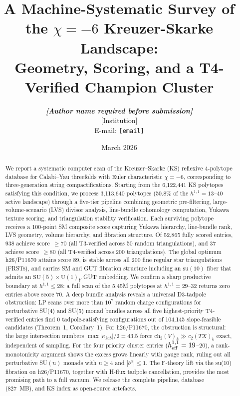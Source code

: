 \documentclass[11pt,a4paper]{article}
\title{%
  \textbf{A Machine-Systematic Survey of the $\chi = -6$
  Kreuzer-Skarke Landscape:}\\[4pt]
  \large Geometry, Scoring, and a T4-Verified Champion Cluster
}
\author{%
  \textit{\normalsize \textbf{[Author name required before submission]}}
  \\[6pt]
  \small [Institution]
  \\[4pt]
  \small E-mail: \texttt{[email]}
}
\date{March 2026}
\newcommand{\hone}{h^{1,1}}
\newcommand{\ch}{\mathrm{ch}}
\begin{document}
\maketitle
\tableofcontents

\begin{abstract}
We report a systematic computer scan of the Kreuzer--Skarke (KS)
reflexive 4-polytope database for Calabi--Yau threefolds with
Euler characteristic $\chi = -6$, corresponding to
three-generation string compactifications.
Starting from the 6,122,441 KS polytopes satisfying this
condition, we process 3,113,640 polytopes (50.8\% of the
$h^{1,1} = 13$--40 active landscape) through a five-tier
pipeline combining geometric pre-filtering, large-volume-scenario
(LVS) divisor analysis, line-bundle cohomology computation,
Yukawa texture scoring, and triangulation stability verification.
Each surviving polytope receives a 100-point SM composite score
capturing Yukawa hierarchy, line-bundle rank, LVS geometry,
volume hierarchy, and fibration structure.
Of 52,865 fully scored entries, 938 achieve score~$\geq 70$
(all T3-verified across 50 random triangulations),
and 37 achieve score~$\geq 80$ (all T4-verified across 200
triangulations).
The global optimum h26/P11670 attains score 89, is stable across
all 200 fine regular star triangulations (FRSTs), and carries
SM and GUT fibration structure including an $\mathrm{su}(10)$
fiber that admits an $\mathrm{SU}(5)\times\mathrm{U}(1)_Y$
GUT embedding.
We confirm a sharp productive boundary at $h^{1,1} \leq 28$:
a full scan of the 5.45M polytopes at $h^{1,1} = 29$--32
returns zero entries above score 70.
A deep bundle analysis reveals a universal D3-tadpole obstruction:
LP scans over more than $10^7$ random charge configurations for
perturbative SU(4) and SU(5) monad bundles across all five
highest-priority T4-verified entries find 0 tadpole-satisfying
configurations out of 104{,}145 slope-feasible candidates
(Theorem~1, Corollary~1).
For h26/P11670, the obstruction is structural: the large intersection
numbers $\max|\kappa_{kab}|/2 = 43.5$ force $\ch_2(V)_k \gg c_2(TX)_k$
exact, independent of sampling.
For the four priority cluster entries
($\hone_{\rm eff}=19$--20), a rank-monotonicity argument shows
the excess grows linearly with gauge rank, ruling out all
perturbative SU$(n)$ monads with $n\geq 4$ and $|b^a|\leq 1$.
The F-theory lift via the su(10) fibration on h26/P11670,
together with H-flux tadpole cancellation, provides the most
promising path to a full vacuum.
We release the complete pipeline, database (827~MB), and
KS index as open-source artefacts.
\end{abstract}
\end{document}
